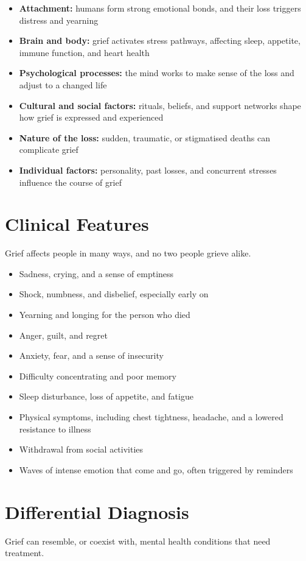\begin{itemize}
    \item \textbf{Attachment:} humans form strong emotional bonds, and their loss triggers distress and yearning
    \item \textbf{Brain and body:} grief activates stress pathways, affecting sleep, appetite, immune function, and heart health
    \item \textbf{Psychological processes:} the mind works to make sense of the loss and adjust to a changed life
    \item \textbf{Cultural and social factors:} rituals, beliefs, and support networks shape how grief is expressed and experienced
    \item \textbf{Nature of the loss:} sudden, traumatic, or stigmatised deaths can complicate grief
    \item \textbf{Individual factors:} personality, past losses, and concurrent stresses influence the course of grief
\end{itemize}

\section*{Clinical Features}
Grief affects people in many ways, and no two people grieve alike.

\begin{itemize}
    \item Sadness, crying, and a sense of emptiness
    \item Shock, numbness, and disbelief, especially early on
    \item Yearning and longing for the person who died
    \item Anger, guilt, and regret
    \item Anxiety, fear, and a sense of insecurity
    \item Difficulty concentrating and poor memory
    \item Sleep disturbance, loss of appetite, and fatigue
    \item Physical symptoms, including chest tightness, headache, and a lowered resistance to illness
    \item Withdrawal from social activities
    \item Waves of intense emotion that come and go, often triggered by reminders
\end{itemize}

\section*{Differential Diagnosis}
Grief can resemble, or coexist with, mental health conditions that need treatment.

